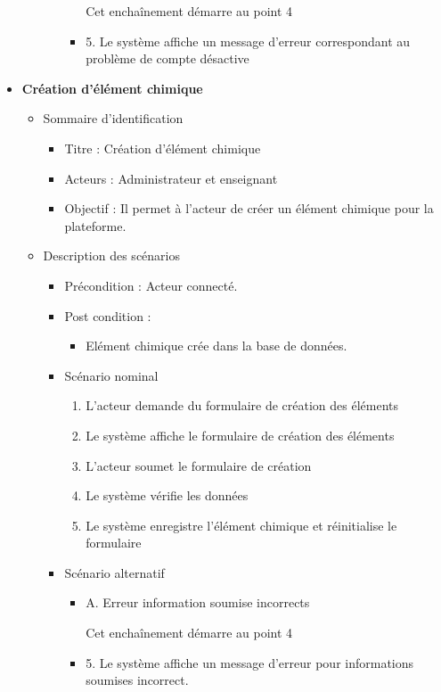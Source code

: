 \begin{itemize}
\begin{itemize}
\begin{itemize}
\begin{itemize}
				Cet enchaînement démarre au point 4 

				\item 5. Le système affiche un message d’erreur correspondant au problème de compte désactive 
			\end{itemize}
		\end{itemize}
	\end{itemize}
	\item \textbf{Création d’élément chimique }
	\begin{itemize}
		\item Sommaire d’identification
		\begin{itemize}
			\item Titre : Création d’élément chimique 
			\item Acteurs : Administrateur et enseignant 
			\item Objectif : Il permet à l’acteur de créer un élément chimique pour la plateforme.
		\end{itemize}
		\item Description des scénarios
		\begin{itemize}
			\item Précondition : Acteur connecté. 
			\item Post condition :
			\begin{itemize}
				\item Elément chimique crée dans la base de données.
			\end{itemize}
			\item Scénario nominal 
			\begin{enumerate}
				\item L’acteur demande du formulaire de création des éléments 
				\item Le système affiche le formulaire de création des éléments
				\item L’acteur soumet le formulaire de création 
				\item Le système vérifie les données 
				\item Le système enregistre l’élément chimique et réinitialise le formulaire 
			\end{enumerate}
			\item Scénario alternatif
			\begin{itemize}
				\item A. Erreur information soumise incorrects 

				Cet enchaînement démarre au point 4 
				
				\item 5. Le système affiche un message d’erreur pour informations soumises incorrect.
			\end{itemize}
		\end{itemize}
	\end{itemize}


\end{itemize}
